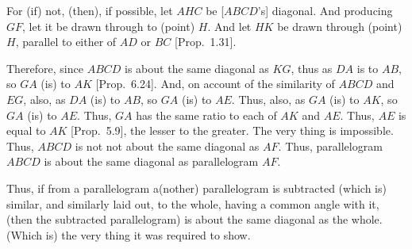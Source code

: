 \begin{Parallel}{}{}
{\epsfysize=2in
\centerline{}

For (if) not, (then), if possible, let $AHC$ be [$ABCD$'s] diagonal. And producing
$GF$, let it be drawn through to (point) $H$. And let $HK$ 
be drawn through (point) $H$, parallel to either of $AD$ or $BC$  [Prop.~1.31].

Therefore, since $ABCD$ is about the same diagonal as $KG$, thus as
$DA$ is to $AB$, so $GA$ (is) to $AK$ [Prop.~6.24].
And, on account of the similarity of $ABCD$ and $EG$, also, as $DA$ (is)
to $AB$, so $GA$ (is) to $AE$. Thus, also, as $GA$ (is) to $AK$, so $GA$ (is)
to $AE$. Thus, $GA$ has the same ratio  to each of $AK$ and $AE$. Thus, 
$AE$ is equal to $AK$ [Prop.~5.9], the
lesser to the greater. The very thing is impossible. Thus, $ABCD$ is not not
about the same diagonal as $AF$. Thus, parallelogram $ABCD$ is
about the same diagonal as parallelogram $AF$.

Thus, if from a parallelogram a(nother) parallelogram
is subtracted (which is) similar, and similarly laid out, to the whole,
having a common angle with it, (then the subtracted parallelogram) is about the same diagonal
as the whole. (Which is) the very thing it was required to show.}
\end{Parallel}

